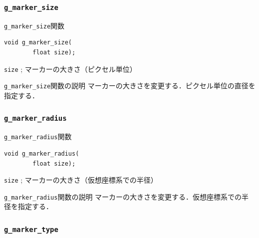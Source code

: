\documentclass[platex,a4paper,12pt]{jsarticle}%
\begin{document}
\subsubsection{\texttt{g\_marker\_size}}

\begin{itembox}[l]{\texttt{g\_marker\_size}関数}
\begin{verbatim}
void g_marker_size(
        float size);
\end{verbatim}
\verb|size| ; マーカーの大きさ（ピクセル単位）
\end{itembox}

\begin{itembox}[l]{\texttt{g\_marker\_size}関数の説明}
マーカーの大きさを変更する．ピクセル単位の直径を指定する．
\end{itembox}

\subsubsection{\texttt{g\_marker\_radius}}

\begin{itembox}[l]{\texttt{g\_marker\_radius}関数}
\begin{verbatim}
void g_marker_radius(
        float size);
\end{verbatim}
\verb|size| ; マーカーの大きさ（仮想座標系での半径）
\end{itembox}

\begin{itembox}[l]{\texttt{g\_marker\_radius}関数の説明}
	マーカーの大きさを変更する．仮想座標系での半径を指定する．
\end{itembox}

\clearpage

\subsubsection{\texttt{g\_marker\_type}}
\end{document}
